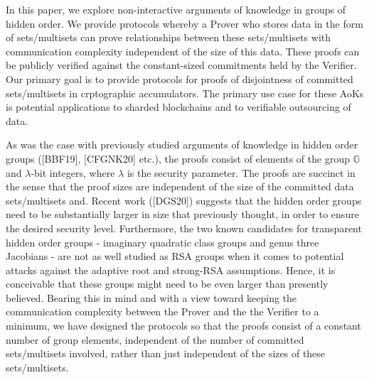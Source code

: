 \documentclass[11pt, lettersize, notitlepage, leqno, footskip=0.6cm]{article}
\newcommand{\mb}{\mathbb}
\newcommand{\lam}{\lambda}
\numberwithin{equation}{section}
\begin{document}
In this paper, we explore non-interactive arguments of knowledge in groups of hidden order. We provide protocols whereby a Prover who stores data in the form of sets/multisets can prove relationships between these sets/multisets with communication complexity independent of the size of this data. These proofs can be publicly verified against the constant-sized commitments held by the Verifier. Our primary goal is to provide protocols for proofs of disjointness of committed sets/multisets in crptographic accumulators. The primary use case for these AoKs is potential applications to sharded blockchains and to verifiable outsourcing of data.

As was the case with previously studied arguments of knowledge in hidden order groups ([BBF19], [CFGNK20] etc.), the proofs consist of elements of the group $\mb{G}$ and $\lam$-bit integers, where $\lam$ is the security parameter. The proofs are succinct in the sense that the proof sizes are independent of the size of the committed data sets/multisets and. Recent work ([DGS20]) suggests that the hidden order groups need to be substantially larger in size that previously thought, in order to ensure the desired security level. Furthermore, the two known candidates for transparent hidden order groups - imaginary quadratic class groups and genus three Jacobians - are not as well studied as RSA groups when it comes to potential attacks against the adaptive root and strong-RSA assumptions. Hence, it is conceivable that these groups might need to be even larger than presently believed. Bearing this in mind and with a view toward keeping the communication complexity between the Prover and the the Verifier to a minimum, we have designed the protocols so that the proofs consist of a constant number of group elements, independent of the number of committed sets/multisets involved, rather than just independent of the sizes of these sets/multisets. %
\end{document}
